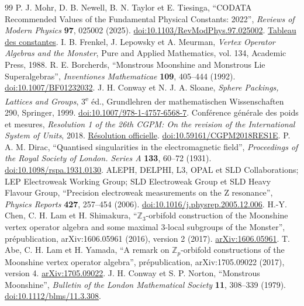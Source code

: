 \begin{thebibliography}{99}
 P. J. Mohr, D. B. Newell, B. N. Taylor et E. Tiesinga, ``CODATA Recommended Values of the Fundamental Physical Constants: 2022'', \emph{Reviews of Modern Physics} \textbf{97}, 025002 (2025). \href{https://doi.org/10.1103/RevModPhys.97.025002}{doi:10.1103/RevModPhys.97.025002}. \href{https://physics.nist.gov/cuu/Constants/Table/allascii.txt}{Tableau des constantes}.
 I. B. Frenkel, J. Lepowsky et A. Meurman, \emph{Vertex Operator Algebras and the Monster}, Pure and Applied Mathematics, vol. 134, Academic Press, 1988.
 R. E. Borcherds, ``Monstrous Moonshine and Monstrous Lie Superalgebras'', \emph{Inventiones Mathematicae} \textbf{109}, 405--444 (1992). \href{https://doi.org/10.1007/BF01232032}{doi:10.1007/BF01232032}.
 J. H. Conway et N. J. A. Sloane, \emph{Sphere Packings, Lattices and Groups}, 3\textsuperscript{e} éd., Grundlehren der mathematischen Wissenschaften 290, Springer, 1999. \href{https://doi.org/10.1007/978-1-4757-6568-7}{doi:10.1007/978-1-4757-6568-7}.
 Conférence générale des poids et mesures, \emph{Resolution 1 of the 26th CGPM: On the revision of the International System of Units}, 2018. \href{https://www.bipm.org/en/committees/cg/cgpm/26-2018/resolution-1}{Résolution officielle}. \href{https://doi.org/10.59161/CGPM2018RES1E}{doi:10.59161/CGPM2018RES1E}.
 P. A. M. Dirac, ``Quantised singularities in the electromagnetic field'', \emph{Proceedings of the Royal Society of London. Series A} \textbf{133}, 60--72 (1931). \href{https://doi.org/10.1098/rspa.1931.0130}{doi:10.1098/rspa.1931.0130}.
 ALEPH, DELPHI, L3, OPAL et SLD Collaborations; LEP Electroweak Working Group; SLD Electroweak Group et SLD Heavy Flavour Group, ``Precision electroweak measurements on the Z resonance'', \emph{Physics Reports} \textbf{427}, 257--454 (2006). \href{https://doi.org/10.1016/j.physrep.2005.12.006}{doi:10.1016/j.physrep.2005.12.006}.
 H.-Y. Chen, C. H. Lam et H. Shimakura, ``\(\mathbb Z_3\)-orbifold construction of the Moonshine vertex operator algebra and some maximal \(3\)-local subgroups of the Monster'', prépublication, arXiv:1606.05961 (2016), version 2 (2017). \href{https://arxiv.org/abs/1606.05961}{arXiv:1606.05961}.
 T. Abe, C. H. Lam et H. Yamada, ``A remark on \(\mathbb Z_p\)-orbifold constructions of the Moonshine vertex operator algebra'', prépublication, arXiv:1705.09022 (2017), version 4. \href{https://arxiv.org/abs/1705.09022v4}{arXiv:1705.09022}.
 J. H. Conway et S. P. Norton, ``Monstrous Moonshine'', \emph{Bulletin of the London Mathematical Society} \textbf{11}, 308--339 (1979). \href{https://doi.org/10.1112/blms/11.3.308}{doi:10.1112/blms/11.3.308}.
\end{thebibliography}
